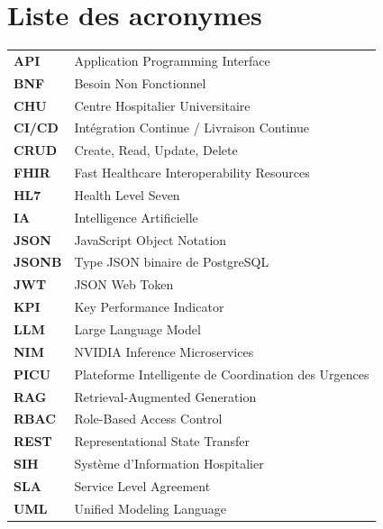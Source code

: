 \chapter*{Liste des acronymes}

\begin{tabular}{ll}
\textbf{API} & Application Programming Interface \\
\textbf{BNF} & Besoin Non Fonctionnel \\
\textbf{CHU} & Centre Hospitalier Universitaire \\
\textbf{CI/CD} & Intégration Continue / Livraison Continue \\
\textbf{CRUD} & Create, Read, Update, Delete \\
\textbf{FHIR} & Fast Healthcare Interoperability Resources \\
\textbf{HL7} & Health Level Seven \\
\textbf{IA} & Intelligence Artificielle \\
\textbf{JSON} & JavaScript Object Notation \\
\textbf{JSONB} & Type JSON binaire de PostgreSQL \\
\textbf{JWT} & JSON Web Token \\
\textbf{KPI} & Key Performance Indicator \\
\textbf{LLM} & Large Language Model \\
\textbf{NIM} & NVIDIA Inference Microservices \\
\textbf{PICU} & Plateforme Intelligente de Coordination des Urgences \\
\textbf{RAG} & Retrieval-Augmented Generation \\
\textbf{RBAC} & Role-Based Access Control \\
\textbf{REST} & Representational State Transfer \\
\textbf{SIH} & Système d'Information Hospitalier \\
\textbf{SLA} & Service Level Agreement \\
\textbf{UML} & Unified Modeling Language \\
\end{tabular}
